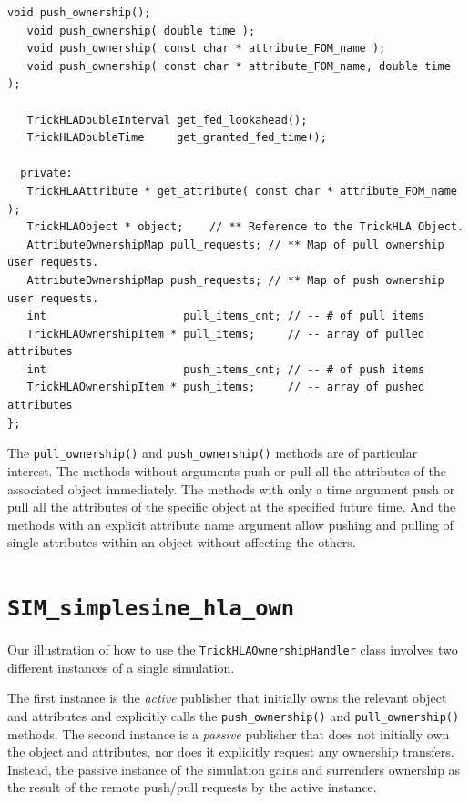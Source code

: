 \begin{lstlisting}[caption={{\tt TrickHLAOwnershipHandler} class header}]
   void push_ownership();
   void push_ownership( double time );
   void push_ownership( const char * attribute_FOM_name );
   void push_ownership( const char * attribute_FOM_name, double time );

   TrickHLADoubleInterval get_fed_lookahead();
   TrickHLADoubleTime     get_granted_fed_time();

  private:
   TrickHLAAttribute * get_attribute( const char * attribute_FOM_name );
   TrickHLAObject * object;    // ** Reference to the TrickHLA Object.
   AttributeOwnershipMap pull_requests; // ** Map of pull ownership user requests.
   AttributeOwnershipMap push_requests; // ** Map of push ownership user requests.
   int                     pull_items_cnt; // -- # of pull items
   TrickHLAOwnershipItem * pull_items;     // -- array of pulled attributes
   int                     push_items_cnt; // -- # of push items
   TrickHLAOwnershipItem * push_items;     // -- array of pushed attributes
};
\end{lstlisting}

The {\tt pull\_ownership()} and {\tt push\_ownership()} methods are of
particular interest.
The methods without arguments push or pull all the attributes of the
associated object immediately.
The methods with only a time argument push or pull all the attributes of the
specific object at the specified future time.
And the methods with an explicit attribute name argument allow pushing and
pulling of single attributes within an object without affecting the others.

\section{\tt SIM\_simplesine\_hla\_own}

Our illustration of how to use the {\tt TrickHLAOwnershipHandler} class
involves two different instances of a single simulation.

The first instance is the {\em active} publisher that
initially owns the relevant object and attributes
and explicitly calls the {\tt push\_ownership()} and {\tt pull\_ownership()}
methods.
The second instance is a {\em passive} publisher that does not initially
own the object and attributes, nor does it explicitly request any ownership
transfers.
Instead, the passive instance of the simulation gains and surrenders
ownership as the result of the remote push/pull requests by the active
instance.

